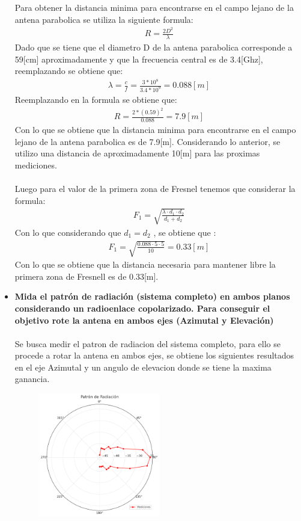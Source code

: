 \begin{itemize}
		Para obtener la distancia minima para encontrarse en el campo lejano de la antena parabolica se utiliza la siguiente formula:
		\begin{align}
			R = \frac{2D^2}{\lambda}
		\end{align}
		Dado que se tiene que el diametro D de la antena parabolica corresponde a 59[cm] aproximadamente y que la frecuencia central es de 3.4[Ghz], reemplazando se obtiene que:
		\begin{align}
			\lambda = \frac{c}{f} = \frac{3*10^8}{3.4*10^9} = 0.088[m]
		\end{align}
		Reemplazando en la formula se obtiene que:
		\begin{align}
			R = \frac{2*(0.59)^2}{0.088} = 7.9[m]
		\end{align}
		Con lo que se obtiene que la distancia minima para encontrarse en el campo lejano de la antena parabolica es de 7.9[m]. Considerando lo anterior, se utilizo una distancia de aproximadamente 10[m] para las proximas mediciones.\\\\
		Luego para el valor de la primera zona de Fresnel tenemos que considerar la formula:
		\begin{align}
			F_{1} = \sqrt{\frac{\lambda \cdot d_{1} \cdot d_{2}}{d_{1} + d_{2}}}
		\end{align}
		Con lo que considerando que $d_{1} = d_{2}$ , se obtiene que :
		\begin{align}
			F_{1} = \sqrt{\frac{0.088 \cdot 5 \cdot 5}{10}} = 0.33[m]
		\end{align} 
		Con lo que se obtiene que la distancia necesaria para mantener libre la primera zona de Fresnell es de 0.33[m].
		\newpage
		\item{ \textbf{Mida el patrón de radiación (sistema completo) en ambos planos considerando un radioenlace copolarizado. Para conseguir el objetivo rote la antena en ambos ejes (Azimutal y Elevación)}}\\\\
		Se busca medir el patron de radiacion del sistema completo, para ello se procede a rotar la antena en ambos ejes, se obtiene los siguientes resultados en el eje Azimutal y un angulo de elevacion donde se tiene la maxima ganancia.
		\begin{figure}
			\centering
			\includegraphics[width=0.5\textwidth]{img/ejemplos/Figure_12}

\end{figure}
\end{itemize}
